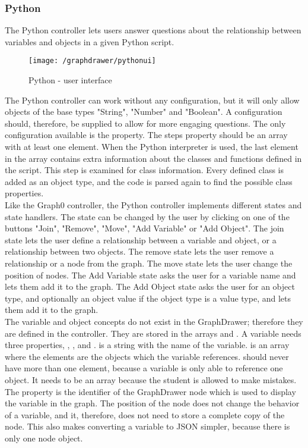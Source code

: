 \subsubsection{Python}
The Python controller lets users answer questions about the relationship between variables and objects in a given Python script.
\begin{figure}[H]
    \centering
    \texttt{[image: /graphdrawer/pythonui]}
    \caption{Python - user interface}
    \label{fig:graphdrawerPythonUserInterface}
\end{figure}
\noindent
The Python controller can work without any configuration, but it will only allow objects of the base types "String", "Number" and "Boolean". A configuration should, therefore, be supplied to allow for more engaging questions. The only configuration available is the  property. The steps property should be an array with at least one element. When the Python interpreter is used, the last element in the array contains extra information about the classes and functions defined in the script. This step is examined for class information. Every defined class is added as an object type, and the code is parsed again to find the possible class properties.
\\[11pt]
Like the Graph0 controller, the Python controller implements different states and state handlers. The state can be changed by the user by clicking on one of the buttons "Join", "Remove", "Move", "Add Variable" or "Add Object". The join state lets the user define a relationship between a variable and object, or a relationship between two objects. The remove state lets the user remove a relationship or a node from the graph. The move state lets the user change the position of nodes. The Add Variable state asks the user for a variable name and lets them add it to the graph. The Add Object state asks the user for an object type, and optionally an object value if the object type is a value type, and lets them add it to the graph.
\\[11pt]
The variable and object concepts do not exist in the GraphDrawer; therefore they are defined in the controller. They are stored in the arrays  and . A variable needs three properties, , , and .  is a string with the name of the variable.  is an array where the elements are the objects which the variable references.  should never have more than one element, because a variable is only able to reference one object. It needs to be an array because the student is allowed to make mistakes. The  property is the identifier of the GraphDrawer node which is used to display the variable in the graph. The position of the node does not change the behavior of a variable, and it, therefore, does not need to store a complete copy of the node. This also makes converting a variable to JSON simpler, because there is only one node object.
